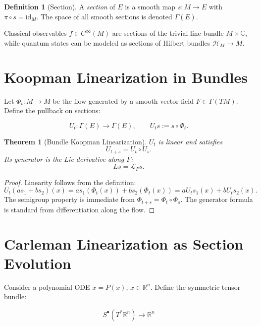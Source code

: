 \documentclass[12pt]{article}
\theoremstyle{definition}
\newtheorem{definition}{Definition}[section]
\theoremstyle{plain}
\newtheorem{theorem}{Theorem}[section]
\begin{document}
\begin{definition}[Section]
A \emph{section} of $E$ is a smooth map $s: M \to E$ with $\pi \circ s = \mathrm{id}_M$. The space of all smooth sections is denoted $\Gamma(E)$.
\end{definition}

Classical observables $f \in C^\infty(M)$ are sections of the trivial line bundle $M \times \mathbb{C}$, while quantum states can be modeled as sections of Hilbert bundles $\mathcal{H}_M \to M$.

\section{Koopman Linearization in Bundles}

Let $\Phi_t: M \to M$ be the flow generated by a smooth vector field $F \in \Gamma(TM)$. Define the pullback on sections:

\begin{equation}
U_t: \Gamma(E) \to \Gamma(E), \qquad U_t s := s \circ \Phi_t.
\end{equation}

\begin{theorem}[Bundle Koopman Linearization]
$U_t$ is linear and satisfies
\begin{equation}
U_{t+s} = U_t \circ U_s.
\end{equation}
Its generator is the Lie derivative along $F$:
\begin{equation}
L s = \mathcal{L}_F s.
\end{equation}
\end{theorem}

\begin{proof}
Linearity follows from the definition:
\[
U_t(a s_1 + b s_2)(x) = a s_1(\Phi_t(x)) + b s_2(\Phi_t(x)) = a U_t s_1(x) + b U_t s_2(x).
\]
The semigroup property is immediate from $\Phi_{t+s} = \Phi_t \circ \Phi_s$. The generator formula is standard from differentiation along the flow.
\end{proof}

\section{Carleman Linearization as Section Evolution}

Consider a polynomial ODE $\dot{x} = P(x)$, $x \in \mathbb{R}^n$. Define the symmetric tensor bundle:

\begin{equation}
S^\bullet(T^* \mathbb{R}^n) \to \mathbb{R}^n
\end{equation}
\end{document}
